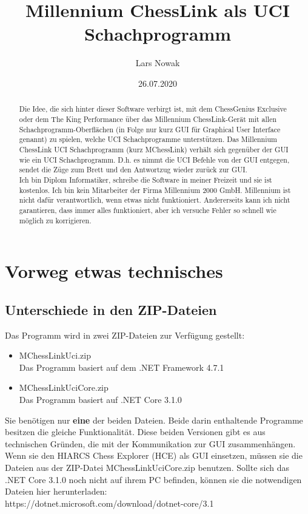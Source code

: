 \documentclass[11pt,a4paper]{article}
\title{Millennium ChessLink als UCI Schachprogramm}
\author{Lars Nowak}
\date{26.07.2020}
\begin{document}
\maketitle

\begin{abstract}
Die Idee, die sich hinter dieser Software verbirgt ist, mit dem ChessGenius Exclusive oder dem The King Performance über das Millennium ChessLink-Gerät mit allen Schachprogramm-Oberflächen (in Folge nur kurz GUI
für Graphical User Interface genannt) zu spielen, welche UCI Schachprogramme unterstützen.
Das Millennium ChessLink UCI Schachprogramm (kurz MChessLink) verhält sich gegenüber der GUI wie ein UCI Schachprogramm. D.h. es nimmt die UCI Befehle von der GUI entgegen, sendet die Züge zum Brett und den Antwortzug wieder zurück zur GUI.\\

Ich bin Diplom Informatiker, schreibe die Software in meiner Freizeit und sie ist kostenlos. Ich bin
kein Mitarbeiter der Firma Millennium 2000 GmbH. Millennium ist nicht dafür verantwortlich,
wenn etwas nicht funktioniert. Andererseits kann ich nicht garantieren, dass immer alles funktioniert,
aber ich versuche Fehler so schnell wie möglich zu korrigieren.

\end{abstract}

\newpage
\tableofcontents
\newpage

\section{Vorweg etwas technisches}

\subsection{Unterschiede in den ZIP-Dateien}
Das Programm wird in zwei ZIP-Dateien zur Verfügung gestellt:
\begin{itemize}
\item MChessLinkUci.zip\\
Das Programm basiert auf dem .NET Framework 4.7.1
\item MChessLinkUciCore.zip\\
Das Programm basiert auf .NET Core 3.1.0
\end{itemize}
Sie benötigen nur \textbf{eine} der beiden Dateien. Beide darin enthaltende Programme besitzen die gleiche Funktionalität. Diese beiden Versionen gibt es aus technischen Gründen, die mit der Kommunikation zur GUI zusammenhängen. Wenn sie den HIARCS Chess Explorer (HCE) als GUI einsetzen, müssen sie die
Dateien aus der ZIP-Datei MChessLinkUciCore.zip benutzen.
Sollte sich das .NET Core 3.1.0 noch nicht auf ihrem PC befinden, können sie die notwendigen
Dateien hier herunterladen:
\\ https://dotnet.microsoft.com/download/dotnet-core/3.1
\end{document}
